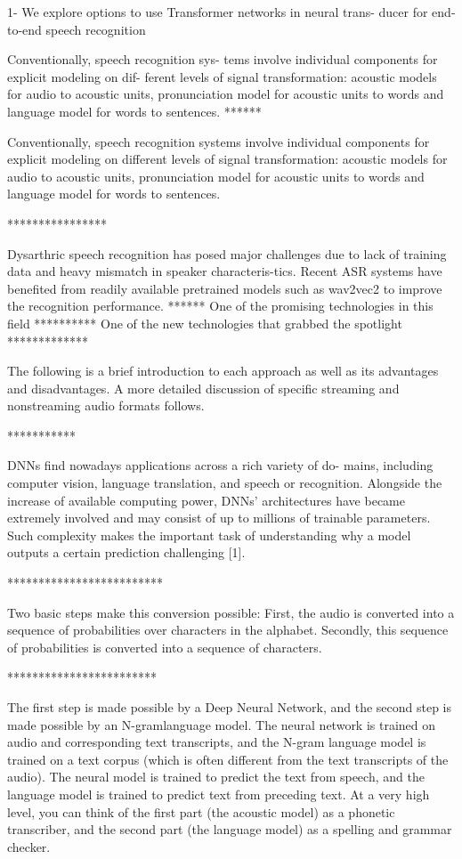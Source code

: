 
1- We explore options to use Transformer networks in neural trans- ducer for end-to-end speech recognition

 Conventionally, speech recognition sys- tems involve individual components for explicit modeling on dif- ferent levels of signal transformation: acoustic models for audio to acoustic units, pronunciation model for acoustic units to words and language model for words to sentences.
******


 Conventionally, speech recognition systems involve individual components for explicit modeling on different levels of signal transformation: acoustic models for audio to acoustic units, pronunciation model for acoustic units to words and language model for words to sentences.
 
 ****************
 
Dysarthric speech recognition has posed major challenges due to
lack of training data and heavy mismatch in speaker characteris-tics. Recent ASR systems have benefited from readily available
pretrained models such as wav2vec2 to improve the recognition
performance.
******
One of the promising technologies in this field
**********
One of the new technologies that grabbed the spotlight
*************


The following is a brief introduction to each approach as well as its advantages and disadvantages. A more detailed discussion of specific streaming and nonstreaming audio formats follows.



***********

DNNs find nowadays applications across a rich variety of do- mains, including computer vision, language translation, and speech or recognition. Alongside the increase of available computing power, DNNs’ architectures have became extremely involved and may consist of up to millions of trainable parameters. Such complexity makes the important task of understanding why a model outputs a certain prediction challenging [1].


*************************




 Two basic steps make this conversion possible: First, the audio is converted into a sequence of probabilities over characters in the alphabet. Secondly, this sequence of probabilities is converted into a sequence of characters.
 
 
 ************************
 
 The first step is made possible by a Deep Neural Network, and the second step is made possible by an N-gramlanguage model. The neural network is trained on audio and corresponding text transcripts, and the N-gram language model is trained on a text corpus (which is often different from the text transcripts of the audio). The neural model is trained to predict the text from speech, and the language model is trained to predict text from preceding text. At a very high level, you can think of the first part (the acoustic model) as a phonetic transcriber, and the second part (the language model) as a spelling and grammar checker.
 
